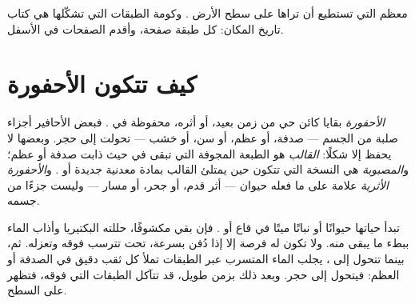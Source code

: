 معظم  التي تستطيع أن تراها على سطح الأرض . وكومة الطبقات
التي تشكّلها هي كتاب تاريخ المكان: كل طبقة صفحة، وأقدم الصفحات في
الأسفل.

\section{كيف تتكون الأحفورة}

\begin{definition}[الأحفورة]\label{def:g7:sediments-and-fossils:fossil}
\emph{الأحفورة} بقايا كائن حي من زمن بعيد، أو أثره، محفوظة
في . فبعض الأحافير أجزاء صلبة من الجسم --- صدفة، أو عظم، أو سن، أو
خشب --- تحولت إلى حجر. وبعضها لا يحفظ إلا شكلًا: \emph{القالب}
هو الطبعة المجوفة التي تبقى في  حيث ذابت صدفة أو عظم؛
و\emph{المصبوبة} هي النسخة التي تتكون حين يمتلئ القالب بمادة
معدنية جديدة أو . و\emph{الأحفورة الأثرية}
علامة على ما فعله حيوان --- أثر قدم، أو جحر، أو مسار --- وليست جزءًا
من جسمه.
\end{definition}

تبدأ  حياتها حيوانًا أو نباتًا ميتًا في قاع  أو . فإن
بقي مكشوفًا، حللته البكتيريا وأذاب الماء ببطء ما يبقى منه. ولا تكون له
فرصة إلا إذا دُفن بسرعة، تحت  تترسب فوقه وتعزله. ثم، بينما تتحول
 إلى ، يجلب الماء المتسرب عبر الطبقات  تملأ كل ثقب دقيق
في الصدفة أو العظم: فيتحول إلى حجر. وبعد ذلك بزمن طويل، قد تتآكل
الطبقات التي فوقه، فتظهر  على السطح.

